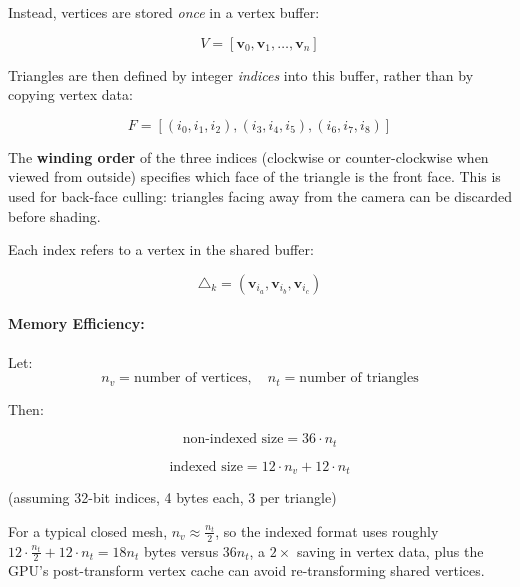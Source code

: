 \documentclass[11pt]{article}
\begin{document}
Instead, vertices are stored \emph{once} in a vertex buffer:

\begin{equation}
    V = [\mathbf{v}_0, \mathbf{v}_1, \dots, \mathbf{v}_n]
\end{equation}

Triangles are then defined by integer \emph{indices} into this buffer, rather than by copying vertex data:

\begin{equation}
    F = [(i_0, i_1, i_2), (i_3, i_4, i_5), (i_6, i_7, i_8)]
\end{equation}

The \textbf{winding order} of the three indices (clockwise or counter-clockwise when viewed from outside) specifies which face of the triangle is the front face. This is used for back-face culling: triangles facing away from the camera can be discarded before shading.

Each index refers to a vertex in the shared buffer:

\begin{equation}
    \triangle_k = (\mathbf{v}_{i_a}, \mathbf{v}_{i_b}, \mathbf{v}_{i_c})
\end{equation}

\paragraph{Memory Efficiency:}

Let:
\begin{equation}
    n_v = \text{number of vertices}, \quad n_t = \text{number of triangles}
\end{equation}

Then:

\begin{equation}
    \text{non-indexed size} = 36 \cdot n_t
\end{equation}

\begin{equation}
    \text{indexed size} = 12 \cdot n_v + 12 \cdot n_t
\end{equation}

(assuming 32-bit indices, 4 bytes each, 3 per triangle)

For a typical closed mesh, $n_v \approx \frac{n_t}{2}$, so the indexed format uses roughly $12 \cdot \frac{n_t}{2} + 12 \cdot n_t = 18 n_t$ bytes versus $36 n_t$, a $2\times$ saving in vertex data, plus the GPU's post-transform vertex cache can avoid re-transforming shared vertices.
\end{document}
